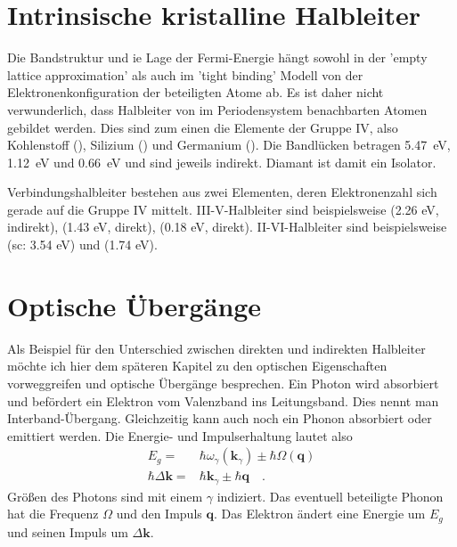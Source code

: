\section{Intrinsische kristalline Halbleiter}

Die Bandstruktur und ie Lage der Fermi-Energie hängt sowohl in der 'empty lattice approximation' als auch im 'tight binding' Modell von der Elektronenkonfiguration der beteiligten Atome ab. Es ist daher nicht verwunderlich, dass Halbleiter von im Periodensystem benachbarten Atomen gebildet werden. Dies sind zum einen die Elemente der Gruppe IV, also Kohlenstoff (), Silizium () und Germanium (). Die Bandlücken betragen 5.47~eV, 1.12~eV und 0.66~eV und sind jeweils indirekt. Diamant ist damit ein Isolator.

Verbindungshalbleiter bestehen aus zwei Elementen, deren Elektronenzahl sich gerade auf die Gruppe IV mittelt. III-V-Halbleiter sind beispielsweise  (2.26 eV, indirekt),  (1.43 eV, direkt),  (0.18 eV, direkt). II-VI-Halbleiter sind beispielsweise  (sc: 3.54 eV) und  (1.74 eV).



\section{Optische Übergänge}

Als Beispiel für den Unterschied zwischen direkten und indirekten Halbleiter möchte ich hier dem späteren Kapitel zu den optischen Eigenschaften vorweggreifen und optische Übergänge besprechen. Ein Photon wird absorbiert und befördert ein Elektron vom Valenzband ins Leitungsband. Dies nennt man Interband-Übergang. Gleichzeitig kann auch noch ein Phonon absorbiert oder emittiert werden. Die Energie- und Impulserhaltung lautet also
\begin{eqnarray}
    E_g = & \hbar \omega_\gamma(\mathbf{k}_\gamma ) \pm \hbar \Omega (\mathbf{q}) \\
    \hbar \Delta \mathbf{k} = &\hbar  \mathbf{k}_\gamma \pm \hbar \mathbf{q} \quad .
\end{eqnarray}
Größen des Photons sind mit einem $\gamma$ indiziert. Das eventuell beteiligte Phonon hat die Frequenz $\Omega$ und den Impuls $\mathbf{q}$. Das Elektron ändert eine Energie um $E_g$ und seinen Impuls um $\Delta \mathbf{k}$.




